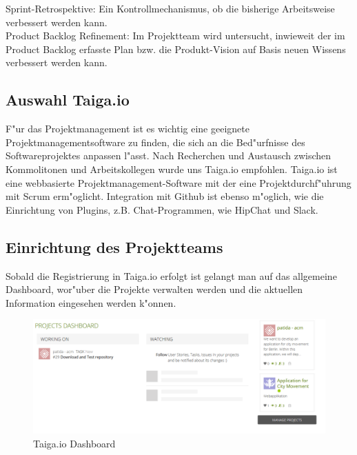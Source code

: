 \documentclass[a4paper, 11pt]{scrreprt}
\begin{document}
Sprint-Retrospektive: Ein Kontrollmechanismus, ob die bisherige Arbeitsweise verbessert werden kann.\\

Product Backlog Refinement: Im Projektteam wird untersucht, inwieweit der im Product Backlog erfasste Plan bzw. die Produkt-Vision auf Basis neuen Wissens verbessert werden kann.


\subsection{Auswahl Taiga.io}

F"ur das Projektmanagement ist es wichtig eine geeignete Projektmanagementsoftware zu finden, die sich an die Bed"urfnisse
des Softwareprojektes anpassen l"asst. Nach Recherchen und Austausch zwischen Kommolitonen und Arbeitskollegen wurde uns Taiga.io empfohlen. Taiga.io ist eine webbasierte Projektmanagement-Software mit der eine Projektdurchf"uhrung mit Scrum
erm"oglicht. Integration mit Github ist ebenso m"oglich, wie die Einrichtung von Plugins, z.B. Chat-Programmen, wie HipChat und Slack.

\subsection{Einrichtung des Projektteams}

Sobald die Registrierung in Taiga.io erfolgt ist gelangt man auf das allgemeine Dashboard, wor"uber die Projekte verwalten werden und die aktuellen Information eingesehen werden k"onnen.\newline

\begin{figure} [H]
\begin{center}


\includegraphics[width=16cm]{dashboard.png}
\caption{Taiga.io Dashboard}

\end{center}
\end{figure}
\end{document}
